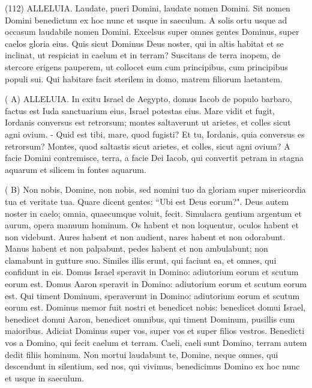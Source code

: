 \begin{biblechapter}  (112) 
\verse ALLELUIA. Laudate, pueri Domini, laudate nomen Domini. 
\verse Sit nomen Domini benedictum ex hoc nunc et usque in saeculum. 
\verse A solis ortu usque ad occasum laudabile nomen Domini. 
\verse Excelsus super omnes gentes Dominus, super caelos gloria eius. 
\verse Quis sicut Dominus Deus noster, qui in altis habitat 
\verse et se inclinat, ut respiciat in caelum et in terram? 
\verse Suscitans de terra inopem, de stercore erigens pauperem, 
\verse ut collocet eum cum principibus, cum principibus populi sui. 
\verse Qui habitare facit sterilem in domo, matrem filiorum laetantem. 
\end{biblechapter}

\begin{biblechapter}  (
\verse A) 
\verse ALLELUIA. In exitu Israel de Aegypto, domus Iacob de populo barbaro, 
\verse factus est Iuda sanctuarium eius, Israel potestas eius. 
\verse Mare vidit et fugit, Iordanis conversus est retrorsum; 
\verse montes saltaverunt ut arietes, et colles sicut agni ovium. - 
\verse Quid est tibi, mare, quod fugisti? Et tu, Iordanis, quia conversus es retrorsum? 
\verse Montes, quod saltastis sicut arietes, et colles, sicut agni ovium? 
\verse A facie Domini contremisce, terra, a facie Dei Iacob, 
\verse qui convertit petram in stagna aquarum et silicem in fontes aquarum. 
\end{biblechapter}

\begin{biblechapter}  (
\verse B) 
\verse Non nobis, Domine, non nobis, sed nomini tuo da gloriam super misericordia tua et veritate tua. 
\verse Quare dicent gentes: “Ubi est Deus eorum?". 
\verse Deus autem noster in caelo; omnia, quaecumque voluit, fecit. 
\verse Simulacra gentium argentum et aurum, opera manuum hominum. 
\verse Os habent et non loquentur, oculos habent et non videbunt. 
\verse Aures habent et non audient, nares habent et non odorabunt. 
\verse Manus habent et non palpabunt, pedes habent et non ambulabunt; non clamabunt in gutture suo. 
\verse Similes illis erunt, qui faciunt ea, et omnes, qui confidunt in eis. 
\verse Domus Israel speravit in Domino: adiutorium eorum et scutum eorum est. 
\verse Domus Aaron speravit in Domino: adiutorium eorum et scutum eorum est. 
\verse Qui timent Dominum, speraverunt in Domino: adiutorium eorum et scutum eorum est. 
\verse Dominus memor fuit nostri et benedicet nobis: benedicet domui Israel, benedicet domui Aaron, 
\verse benedicet omnibus, qui timent Dominum, pusillis cum maioribus. 
\verse Adiciat Dominus super vos, super vos et super filios vestros. 
\verse Benedicti vos a Domino, qui fecit caelum et terram. 
\verse Caeli, caeli sunt Domino, terram autem dedit filiis hominum. 
\verse Non mortui laudabunt te, Domine, neque omnes, qui descendunt in silentium, 
\verse sed nos, qui vivimus, benedicimus Domino ex hoc nunc et usque in saeculum. 
\end{biblechapter}

